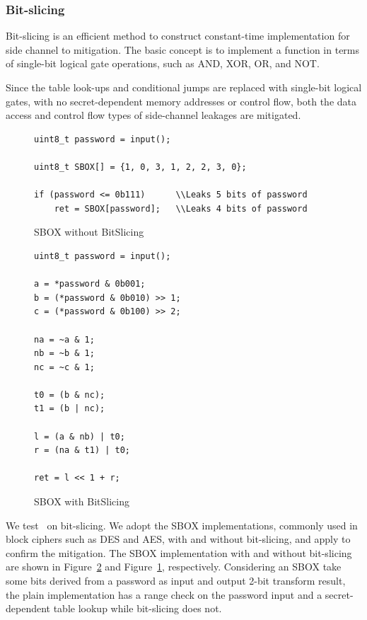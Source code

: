 \subsubsection*{Bit-slicing}
Bit-slicing is an efficient method to construct constant-time implementation for side channel to mitigation. The basic concept is to implement a function in terms of single-bit logical gate operations, such as AND, XOR, OR, and NOT\@.

Since the table look-ups and conditional jumps are replaced with single-bit logical gates, with no secret-dependent memory addresses or control flow, both the data access and control flow types of side-channel leakages are mitigated.
\begin{figure}[h!]
    \centering
    \begin{lstlisting}[xleftmargin=.2\textwidth, xrightmargin=.0\textwidth, frame=none]
uint8_t password = input();

uint8_t SBOX[] = {1, 0, 3, 1, 2, 2, 3, 0};

if (password <= 0b111)      \\Leaks 5 bits of password
    ret = SBOX[password];   \\Leaks 4 bits of password
      \end{lstlisting}
    \caption{SBOX without BitSlicing}
    \label{fig:SBOX_da}
\end{figure}


\begin{figure}[h!]
    \centering
    \begin{lstlisting}[xleftmargin=.2\textwidth, xrightmargin=.0\textwidth, frame=none]
uint8_t password = input();

a = *password & 0b001;
b = (*password & 0b010) >> 1;
c = (*password & 0b100) >> 2;

na = ~a & 1;
nb = ~b & 1;
nc = ~c & 1;

t0 = (b & nc);
t1 = (b | nc);

l = (a & nb) | t0;
r = (na & t1) | t0;

ret = l << 1 + r;
\end{lstlisting}
\caption{SBOX with BitSlicing}
\label{fig:SBOX_bitslicing}
\end{figure}
We test \tool\ on bit-slicing. We adopt the SBOX
implementations, commonly used in block ciphers such as DES and AES, with and
without bit-slicing, and apply \tool{} to confirm the mitigation. The SBOX implementation with and without bit-slicing are shown in Figure~\ref{fig:SBOX_bitslicing} and Figure~\ref{fig:SBOX_da}, respectively. Considering an SBOX take some bits derived from a password as input and output 2-bit transform result, the plain implementation
has a range check on the password input and a secret-dependent table lookup while bit-slicing does not.

